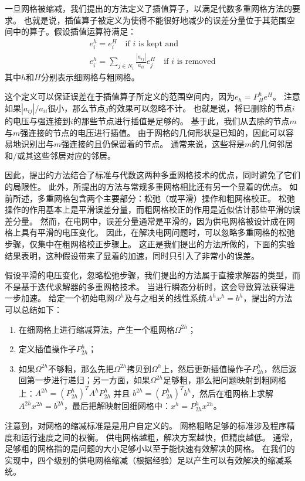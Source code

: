 一旦网格被缩减，我们提出的方法定义了插值算子，以满足代数多重网格方法的要求。 也就是说，插值算子被定义为使得不能很好地减少的误差分量位于其范围空间中的算子。假设插值运算符满足：
\begin{align}
e^h_i=e^H_i \quad \text{if }i\text{ is kept and} \\
e^h_i=\sum_{j\in N_i} \frac{|a_{ij}|}{a_{ii}} e^H_j \quad \text{if }i\text{ is removed}
\end{align}
其中$h$和$H$分别表示细网格与粗网格。

这个定义可以保证误差在于插值算子所定义的范围空间内，因为$e_h = P_H^he^H$。 注意如果$|a_{ij}|/a_{ii}$很小，那么节点$j$的效果可以忽略不计。 也就是说，将已删除的节点$i$的电压与强连接到$i$的那些节点进行插值是足够的。 基于此，我们从去除的节点$m$与$m$强连接的节点的电压进行插值。 由于网格的几何形状是已知的，因此可以容易地识别出与$m$强连接的且仍保留着的节点。 通常来说，这些将是$m$的几何邻居和/或其这些邻居对应的邻居。

因此，提出的方法结合了标准与代数这两种多重网格技术的优点，同时避免了它们的局限性。 此外，所提出的方法与常规多重网格相比还有另一个显着的优点。 如前所述，多重网格包含两个主要部分：松弛（或平滑）操作和粗网格校正。 松弛操作的作用基本上是平滑误差分量，而粗网格校正的作用是近似估计那些平滑的误差分量。 然而，在电网中，误差分量通常是平滑的，因为供电网格被设计成在网格上具有平滑的电压变化。 因此，在解决电网问题时，可以忽略多重网格的松弛步骤，仅集中在粗网格校正步骤上。 这正是我们提出的方法所做的，下面的实验结果表明，这种假设带来了显着的加速，同时只引入了非常小的误差。

假设平滑的电压变化，忽略松弛步骤，我们提出的方法属于直接求解器的类型，而不是基于迭代求解器的多重网格技术。 当进行瞬态分析时，这会导致算法获得进一步加速。 给定一个初始电网$\Omega^h$及与之相关的线性系统$A^hx^h = b^h$，提出的方法可以总结如下：
\begin{enumerate}
\item 在细网格上进行缩减算法，产生一个粗网格$\Omega^{2h}$；
\item 定义插值操作子$P_{2h}^h$；
\item 如果$\Omega^{2h}$不够粗，那么先把$\Omega^{2h}$拷贝到$\Omega^h$上，然后更新插值操作子$P_{2h}^h$，然后返回第一步进行递归；另一方面，如果$\Omega^{2h}$足够粗，那么把问题映射到粗网格上：$A^{2h}=(P_{2h}^h)^TA^hP^h_{2h}$ 并且
$b^{2h}=(P^h_{2h})^Tb^h$，然后在粗网格上求解$A^{2h}x^{2h}=b^{2h}$，最后把解映射回细网格中：$x^h=P^h_{2h}x^{2h}$。
\end{enumerate}

注意到，对网格的缩减标准是是用户自定义的。 网格粗略足够的标准涉及程序精度和运行速度之间的权衡。 供电网格越粗，解决方案越快，但精度越低。 通常，足够粗的网格指的是问题的大小足够小以至于能快速有效解决的网格。 在我们的实现中，四个级别的供电网格缩减（根据经验）足以产生可以有效解决的缩减系统。

